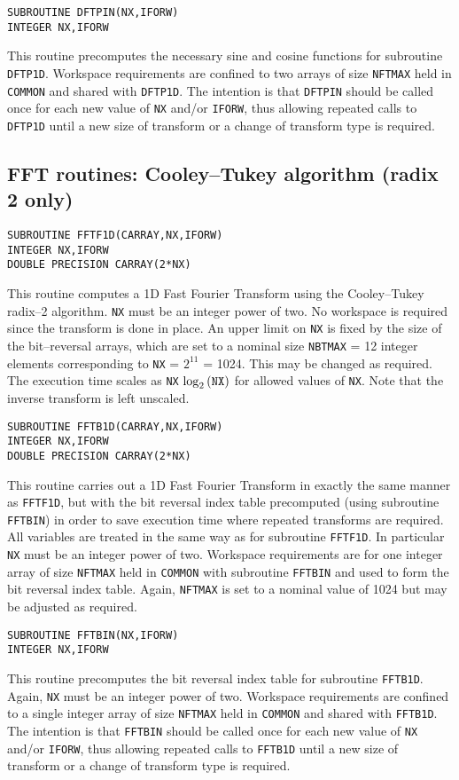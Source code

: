 \documentclass[dvips]{article}
\begin{document}
\begin{verbatim}
SUBROUTINE DFTPIN(NX,IFORW)
INTEGER NX,IFORW
\end{verbatim}
This routine precomputes the necessary sine and cosine functions for subroutine
{\tt DFTP1D}.
Workspace requirements are confined to two arrays of size {\tt NFTMAX}
held in {\tt COMMON} and shared with {\tt DFTP1D}.
The intention is that {\tt DFTPIN} should be called once
for each new value of {\tt NX} and/or {\tt IFORW}, thus allowing 
repeated calls to {\tt DFTP1D} until a new size of transform or a change
of transform type is required.

\subsection*{FFT routines: Cooley--Tukey algorithm (radix 2 only)}
\begin{verbatim}
SUBROUTINE FFTF1D(CARRAY,NX,IFORW)
INTEGER NX,IFORW
DOUBLE PRECISION CARRAY(2*NX)
\end{verbatim}
This routine computes a 1D Fast Fourier Transform using the Cooley--Tukey
radix--2 algorithm.  {\tt NX} must be an integer power of two.  No workspace is
required since the transform is done in place.  An upper limit on 
{\tt NX} is fixed by the size of the bit--reversal arrays, which are set
to a nominal size {\tt NBTMAX} = 12 integer elements corresponding to
{\tt NX} = $2^{11}$ = 1024.  This may be changed as required.
The execution
time scales as {\tt NX} $\log_{2}{({\tt NX})}$ for allowed values of
{\tt NX}.  Note that the inverse transform is left unscaled.

\begin{verbatim}
SUBROUTINE FFTB1D(CARRAY,NX,IFORW)
INTEGER NX,IFORW
DOUBLE PRECISION CARRAY(2*NX)
\end{verbatim}
This routine carries out a 1D Fast Fourier Transform in exactly the
same manner as {\tt FFTF1D}, but with the bit reversal index table
precomputed (using subroutine {\tt FFTBIN}) in order to save
execution time where repeated transforms are required.
All variables are treated in the same way as for subroutine {\tt FFTF1D}.
In particular {\tt NX} must be an integer power of two.  Workspace requirements are for one integer array of size {\tt NFTMAX}
held in {\tt COMMON} with subroutine {\tt FFTBIN} and used to
form the bit reversal index table. 
Again, {\tt NFTMAX} is set to a nominal value of 1024 but may be adjusted
as required.

\begin{verbatim}
SUBROUTINE FFTBIN(NX,IFORW)
INTEGER NX,IFORW
\end{verbatim}
This routine precomputes the bit reversal index table for subroutine
{\tt FFTB1D}.  Again, {\tt NX} must be an integer power of two.
Workspace requirements are confined to a single integer array of size
{\tt NFTMAX} held in {\tt COMMON} and shared with {\tt FFTB1D}.
The intention is that {\tt FFTBIN} should be called once
for each new value of {\tt NX} and/or {\tt IFORW}, thus allowing 
repeated calls to {\tt FFTB1D} until a new size of transform or a change
of transform type is required.
\end{document}
